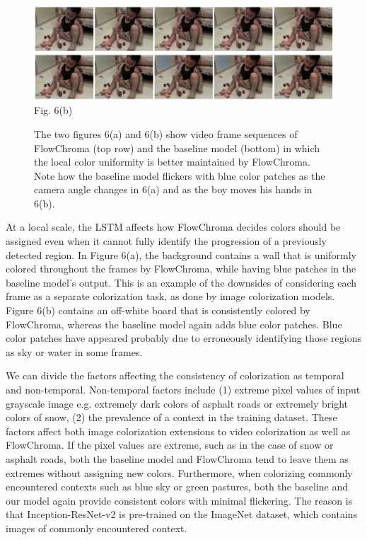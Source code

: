 \documentclass[10pt,twocolumn,letterpaper]{article}
\begin{document}
\begin{figure}[!h]
\includegraphics[width=\textwidth]{fc-dk-playing.png}
\centering
\label{}{\footnotesize Fig. 6(b)}
\caption{The two figures 6(a) and 6(b) show video frame sequences of FlowChroma (top row) and the baseline model (bottom) in which the local color uniformity is better maintained by FlowChroma. Note how the baseline model flickers with blue color patches as the camera angle changes in 6(a) and as the boy moves his hands in 6(b).}
\end{figure}

At a local scale, the LSTM affects how FlowChroma decides colors should be assigned even when it cannot fully identify the progression of a previously detected region. In Figure 6(a), the background contains a wall that is uniformly colored throughout the frames by FlowChroma, while having blue patches in the baseline model's output. This is an example of the downsides of considering each frame as a separate colorization task, as done by image colorization models. Figure 6(b) contains an off-white board that is consistently colored by FlowChroma, whereas the baseline model again adds blue color patches. Blue color patches have appeared probably due to erroneously identifying those regions as sky or water in some frames.

We can divide the factors affecting the consistency of colorization as temporal and non-temporal. Non-temporal factors include (1) extreme pixel values of input grayscale image e.g. extremely dark colors of asphalt roads or extremely bright colors of snow, (2) the prevalence of a context in the training dataset. These factors affect both image colorization extensions to video colorization as well as FlowChroma. If the pixel values are extreme, such as in the case of snow or asphalt roads, both the baseline model and FlowChroma tend to leave them as extremes without assigning new colors. Furthermore, when colorizing commonly encountered contexts such as blue sky or green pastures, both the baseline and our model again provide consistent colors with minimal flickering. The reason is that Inception-ResNet-v2 is pre-trained on the ImageNet dataset, which contains  images of commonly encountered context.
\end{document}
